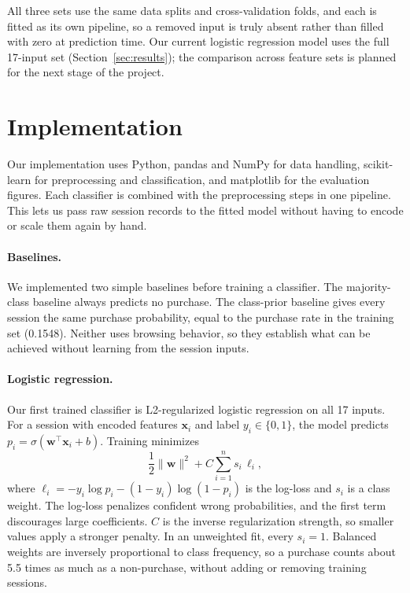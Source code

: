 \documentclass[11pt]{article}
\begin{document}
All three sets use the same data splits and cross-validation folds, and each
is fitted as its own pipeline, so a removed input is truly absent rather than
filled with zero at prediction time. Our current logistic regression model
uses the full 17-input set (Section~\ref{sec:results}); the comparison
across feature sets is planned for the next stage of the project.

\section{Implementation}
\label{sec:implementation}

Our implementation uses Python, pandas and NumPy for data handling,
scikit-learn for preprocessing and classification, and matplotlib for the
evaluation figures. Each classifier is combined with the preprocessing steps
in one pipeline. This lets us pass raw session records to the fitted model
without having to encode or scale them again by hand.

\paragraph{Baselines.} We implemented two simple baselines before training a
classifier. The majority-class baseline always predicts no purchase. The
class-prior baseline gives every session the same purchase probability,
equal to the purchase rate in the training set (0.1548). Neither uses browsing
behavior, so they establish what can be achieved without learning from the
session inputs.

\paragraph{Logistic regression.} Our first trained classifier is
L2-regularized logistic regression on all 17 inputs. For a session with
encoded features $\mathbf{x}_i$ and label $y_i \in \{0, 1\}$, the model
predicts $p_i = \sigma(\mathbf{w}^\top \mathbf{x}_i + b)$. Training minimizes
\begin{equation*}
  \frac{1}{2}\lVert \mathbf{w} \rVert^2
  + C \sum_{i=1}^{n} s_i \, \ell_i ,
\end{equation*}
where $\ell_i = -y_i \log p_i - (1 - y_i) \log (1 - p_i)$ is the log-loss
and $s_i$ is a class weight. The log-loss penalizes confident wrong
probabilities, and the first term discourages large coefficients. $C$ is the
inverse regularization strength, so smaller values apply a stronger penalty.
In an unweighted fit, every $s_i = 1$. Balanced weights are inversely
proportional to class frequency, so a purchase counts about 5.5 times as much
as a non-purchase, without adding or removing training sessions.
\end{document}
